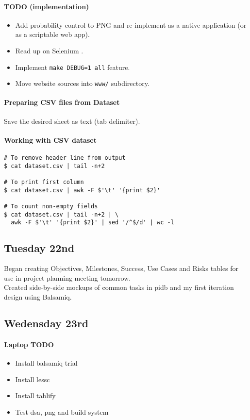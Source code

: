 \paragraph{TODO (implementation)}
\begin{itemize}
\item Add probability control to PNG and re-implement as a native application
  (or as a scriptable web app).
\item Read up on Selenium \cite{SeleniumND}.
\item Implement \texttt{make DEBUG=1 all} feature.
\item Move website sources into \texttt{www/} subdirectory.
\end{itemize}

\paragraph{Preparing CSV files from Dataset} Save the desired sheet as text (tab delimiter).

\paragraph{Working with CSV dataset}
\begin{verbatim}
# To remove header line from output
$ cat dataset.csv | tail -n+2

# To print first column
$ cat dataset.csv | awk -F $'\t' '{print $2}'

# To count non-empty fields
$ cat dataset.csv | tail -n+2 | \
  awk -F $'\t' '{print $2}' | sed '/^$/d' | wc -l
\end{verbatim}

\subsection{Tuesday 22nd}
Began creating Objectives, Milestones, Success, Use Cases and Risks tables for
use in project planning meeting tomorrow.\\

\noindent
Created side-by-side mockups of common tasks in pidb and my first iteration
design using Balsamiq.

\subsection{Wedensday 23rd}
\paragraph{Laptop TODO}
\begin{itemize}
\item Install balsamiq trial
\item Install lessc
\item Install tablify
\item Test dsa, png and build system
\end{itemize}


